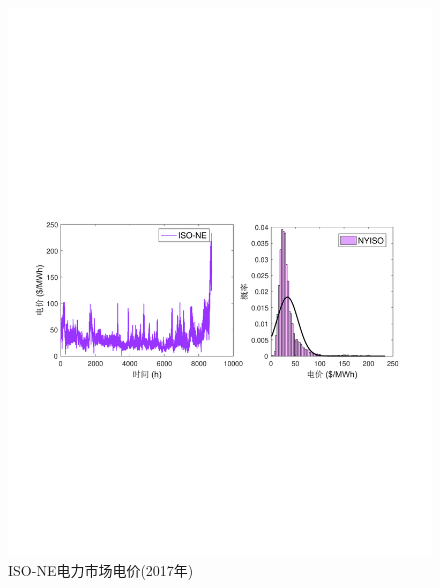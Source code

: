 \begin{figure}[H] %
  \centering
  \includegraphics[scale=0.75]{figures/Chap5-15-Price-NEISO.pdf}
  \caption{ISO-NE电力市场电价(2017年)}
  \label{fig:Price-NEISO}
\end{figure}

